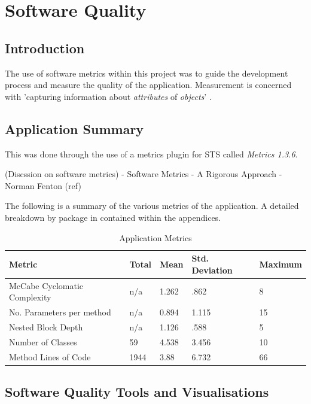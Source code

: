 \chapter{Software Quality}
\label{squality}

\section{Introduction}

The use of software metrics within this project was to guide the development process and measure the quality of the application. Measurement is concerned with 'capturing information about \textit{attributes} of \textit{objects}' \parencite{softmetrics}.

\section{Application Summary}

 This was done through the use of a metrics plugin for STS called \textit{Metrics 1.3.6}. 

(Discssion on software metrics)
- Software Metrics - A Rigorous Approach - Norman Fenton (ref)

The following is a summary of the various metrics of the application. A detailed breakdown by package in contained within the appendices.

\begin{table}[H]
\begin{center}
    \begin{tabular}{| l | l | l | l | p{2.3cm} |}
    \hline
    Metric & Total & Mean & Std. Deviation & Maximum\\ \hline
	McCabe Cyclomatic Complexity & n/a & 1.262 & .862 & 8\\ \hline
	No. Parameters per method & n/a & 0.894 & 1.115 & 15\\ \hline
	Nested Block Depth & n/a & 1.126 & .588 & 5\\ \hline
	Number of Classes & 59 & 4.538 & 3.456 & 10\\ \hline
	Method Lines of Code& 1944 & 3.88 & 6.732 & 66\\ \hline
    
    \end{tabular}
\end{center}
\caption{Application Metrics}
\end{table}


\section{Software Quality Tools and Visualisations}

